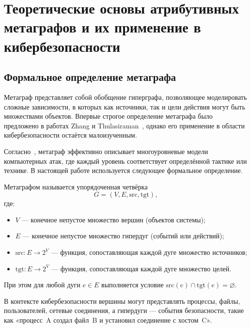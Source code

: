 
\chapter{Теоретические основы атрибутивных метаграфов и их применение в кибербезопасности}\label{ch:ch2}

\section{Формальное определение метаграфа}\label{sec:ch2/sec1}

Метаграф представляет собой обобщение гиперграфа, позволяющее моделировать сложные зависимости, в которых как источники, так и цели действия могут быть множествами объектов. Впервые строгое определение метаграфа было предложено в работах Zhang и Thulasiraman~\cite{Zhang2006}, однако его применение в области кибербезопасности остаётся малоизученным.

Согласно~\cite{Latypov2020}, метаграф эффективно описывает многоуровневые модели компьютерных атак, где каждый уровень соответствует определённой тактике или технике. В настоящей работе используется следующее формальное определение.

\begin{definition}
    Метаграфом называется упорядоченная четвёрка
    \[
        G = (V, E, \mathrm{src}, \mathrm{tgt}),
    \]
    где:
    \begin{itemize}
        \item $V$ — конечное непустое множество вершин (объектов системы);
        \item $E$ — конечное непустое множество гипердуг (событий или действий);
        \item $\mathrm{src}: E \rightarrow 2^V$ — функция, сопоставляющая каждой дуге множество источников;
        \item $\mathrm{tgt}: E \rightarrow 2^V$ — функция, сопоставляющая каждой дуге множество целей.
    \end{itemize}
        При этом для любой дуги $e \in E$ выполняется условие $\mathrm{src}(e) \cap \mathrm{tgt}(e) = \varnothing$.
\end{definition}

В контексте кибербезопасности вершины могут представлять процессы, файлы, пользователей, сетевые соединения, а гипердуги — события безопасности, такие как «процесс~A создал файл~B и установил соединение с хостом~C».

